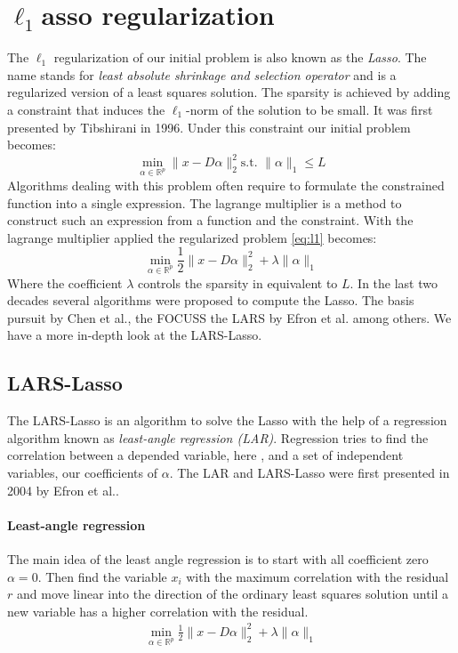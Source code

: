 \section { $\ell_1$asso regularization}
The $\ell_1$ regularization of our initial problem is also known as the
\emph{Lasso}. The name stands for \emph{least absolute shrinkage and
selection operator} and is a regularized version of a least squares
solution. The sparsity is achieved by adding a constraint that induces
the $\ell_1$-norm of the solution to be small. It was first presented by
Tibshirani
in 1996\cite{Tibshirani1996}. Under this constraint our initial problem becomes:
\begin{equation}
\min_{\alpha\in\mathbb{R}^{p}} \lVert x - D\alpha \rVert^{2}_{2} \textrm{
s.t. } \lVert \alpha \rVert_{1} \leq L \label{eq:l1}
\end{equation}
Algorithms dealing with this problem often require to formulate the
constrained function into a single expression. The lagrange multiplier is a
method to construct such an expression from a function and the constraint. With
the  lagrange multiplier applied the regularized problem \ref{eq:l1} becomes:
\begin{equation}
\min_{\alpha\in\mathbb{R}^{p}}  \frac{1}{2} \lVert x - D\alpha \rVert^{2}_{2} +
\lambda \lVert \alpha \rVert_{1}\label{eq:l1lagrange}
\end{equation}
Where the coefficient $\lambda$ controls the sparsity in equivalent to $L$.
In the last two decades several algorithms were proposed to compute the
Lasso. The basis pursuit by Chen et al.\cite{Chen1995}, the FOCUSS\cite{FOCUSS}
the LARS by Efron et al.\cite{Efron2004} among others. We have a more in-depth
look at the LARS-Lasso.


\subsection{LARS-Lasso}
\label{sec:lars}
The LARS-Lasso is an algorithm to solve the Lasso with the help of a regression
algorithm known as \emph{least-angle regression (LAR)}. Regression tries to find
the correlation between a depended variable, here , and
a set of independent variables, our coefficients of $\alpha$.
The LAR and LARS-Lasso were first presented in 2004 by Efron et
al.\cite{Efron2004}.


\paragraph{Least-angle regression}
The main idea of the least angle regression is to start with all coefficient
zero $\alpha = 0$. Then find the variable $x_i$ with the maximum correlation
with the residual $r$ and move linear into the direction of the ordinary least
squares solution until a new variable has a higher correlation with the
residual.  
\begin{align}
\min_{\alpha\in\mathbb{R}^{p}}  \frac{1}{2} \lVert x - D\alpha \rVert^{2}_{2} +
\lambda \lVert \alpha \rVert_{1}
\end{align}

